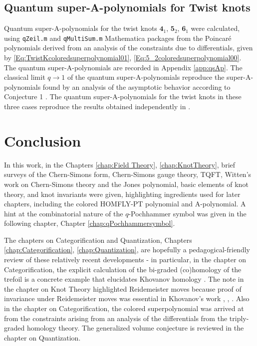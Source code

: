 \documentclass[a4paper,titlepage,twoside]{book}
\begin{document}
\section{Quantum super-A-polynomials for Twist knots }

Quantum super-A-polynomials for the twist knots $\mathbf{4}_1$, $\mathbf{5}_2$, $\mathbf{6}_1$ were calculated, using \texttt{qZeil.m} and \texttt{qMultiSum.m} Mathematica packages from the Poincar\'{e} polynomials derived from an analysis of the constraints due to differentials, given by \eqref{Eq:TwistKcoloredsuperpolynomial01}, \eqref{Eq:5_2coloredsuperpolynomial00}.  The quantum super-A-polynomials are recorded in Appendix \ref{app:qsAp}.  The classical limit $q\to 1$ of the quantum super-A-polynomials reproduce the super-A-polynomials found by an analysis of the asymptotic behavior according to Conjecture 1 \cite{FujiGukovStosicSulkowski2013}.  The quantum super-A-polynomials for the twist knots in these three cases reproduce the results obtained independently in \cite{NRZ2013}.







\chapter{Conclusion} \label{ch:Conclusion}

In this work, in the Chapters \ref{chap:Field Theory}, \ref{chap:KnotTheory}, brief surveys of the Chern-Simons form, Chern-Simons gauge theory, TQFT, Witten's work on Chern-Simons theory and the Jones polynomial, basic elements of knot theory, and knot invariants were given, highlighting ingredients used for later chapters, including the colored HOMFLY-PT polynomial and A-polynomial.  A hint at the combinatorial nature of the $q$-Pochhammer symbol was given in the following chapter, Chapter \ref{chap:qPochhammersymbol}.  

The chapters on Categorification and Quantization, Chapters \ref{chap:Categorification}, \ref{chap:Quantization}, are hopefully a pedagogical-friendly review of these relatively recent developments - in particular, in the chapter on Categorification, the explicit calculation of the bi-graded (co)homology of the trefoil is a concrete example that elucidates Khovanov homology \cite{Bar-Natan2002}.  The note in the chapter on Knot Theory highlighted Reidemeister moves because proof of invariance under Reidemeister moves was essential in Khovanov's work \cite{Khovanov2000}, \cite{KhovanovRozansky2004}, \cite{KhovanovRozansky2005}.  Also in the chapter on Categorification, the colored superpolynomial was arrived at from the constraints arising from an analysis of the differentials from the triply-graded homology theory.  The generalized volume conjecture is reviewed in the chapter on Quantization.
\end{document}
